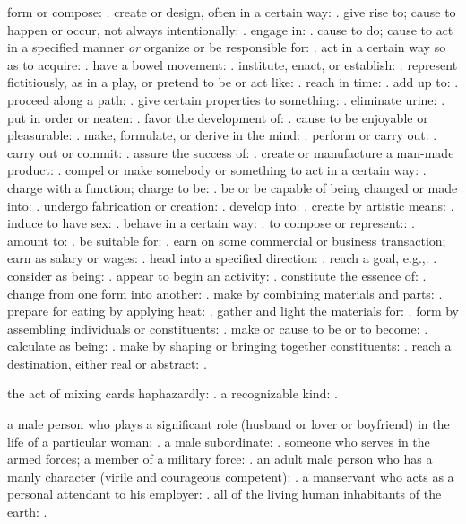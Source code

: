   form or compose: . create or design, often in a certain way: . give rise to; cause to happen or occur, not always intentionally: . engage in: . cause to do; cause to act in a specified manner \textit{or} organize or be responsible for: . act in a certain way so as to acquire: . have a bowel movement: . institute, enact, or establish: . represent fictitiously, as in a play, or pretend to be or act like: . reach in time: . add up to: . proceed along a path: . give certain properties to something: . eliminate urine: . put in order or neaten: . favor the development of: . cause to be enjoyable or pleasurable: . make, formulate, or derive in the mind: . perform or carry out: . carry out or commit: . assure the success of: . create or manufacture a man-made product: . compel or make somebody or something to act in a certain way: . charge with a function; charge to be: . be or be capable of being changed or made into: . undergo fabrication or creation: . develop into: . create by artistic means: . induce to have sex: . behave in a certain way: . to compose or represent:: . amount to: . be suitable for: . earn on some commercial or business transaction; earn as salary or wages: . head into a specified direction: . reach a goal, e.g.,: . consider as being: . appear to begin an activity: . constitute the essence of: . change from one form into another: . make by combining materials and parts: . prepare for eating by applying heat: . gather and light the materials for: . form by assembling individuals or constituents: . make or cause to be or to become: . calculate as being: . make by shaping or bringing together constituents: . reach a destination, either real or abstract: .

  the act of mixing cards haphazardly: . a recognizable kind: .

  a male person who plays a significant role (husband or lover or boyfriend) in the life of a particular woman: . a male subordinate: . someone who serves in the armed forces; a member of a military force: . an adult male person who has a manly character (virile and courageous competent): . a manservant who acts as a personal attendant to his employer: . all of the living human inhabitants of the earth: .

